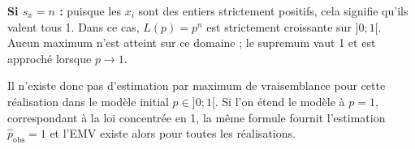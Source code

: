 {\begin{enumerate}
\begin{enumerate}
{\textbf{Si $s_x=n$ :} puisque les $x_i$ sont des entiers strictement positifs, cela signifie qu'ils valent tous 1. Dans ce cas, $L(p)=p^n$ est strictement croissante sur $]0;1[$. Aucun maximum n'est atteint sur ce domaine ; le supremum vaut 1 et est approché lorsque $p\to1$.

Il n'existe donc pas d'estimation par maximum de vraisemblance pour cette réalisation dans le modèle initial $p\in]0;1[$. Si l'on étend le modèle à $p=1$, correspondant à la loi concentrée en 1, la même formule fournit l'estimation $\widehat p_{\mathrm{obs}}=1$ et l'EMV existe alors pour toutes les réalisations.}
	\end{enumerate}
\end{enumerate}
}
